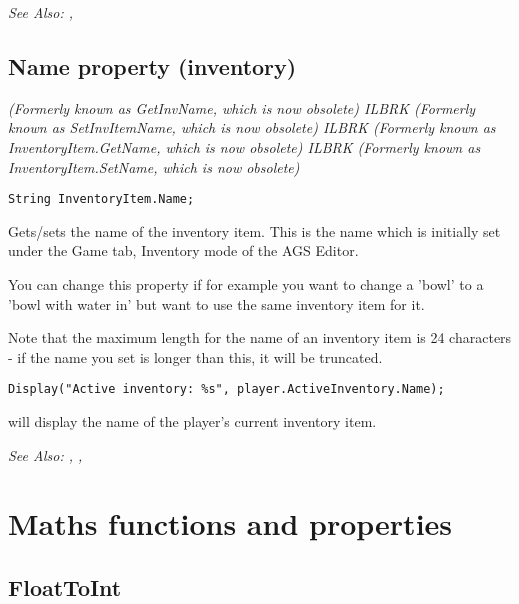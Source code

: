\it{See Also:} ,


\subsection{Name property (inventory)}\label{InventoryItem.Name}%

\it{(Formerly known as GetInvName, which is now obsolete)} ILBRK
\it{(Formerly known as SetInvItemName, which is now obsolete)} ILBRK
\it{(Formerly known as InventoryItem.GetName, which is now obsolete)} ILBRK
\it{(Formerly known as InventoryItem.SetName, which is now obsolete)}

\begin{verbatim}
String InventoryItem.Name;
\end{verbatim}
Gets/sets the name of the inventory item. This is the name which is
initially set under the Game tab, Inventory mode of the AGS Editor.

You can change this property if for example you want to change a 'bowl'
to a 'bowl with water in' but want to use the same inventory item for it.

Note that the maximum length for the name of an inventory item is 24 characters - if the
name you set is longer than this, it will be truncated.

\begin{verbatim}
Display("Active inventory: %s", player.ActiveInventory.Name);
\end{verbatim}
will display the name of the player's current inventory item.

\it{See Also:} ,
,



\section{Maths functions and properties}%



\subsection{FloatToInt}\label{FloatToInt}%

